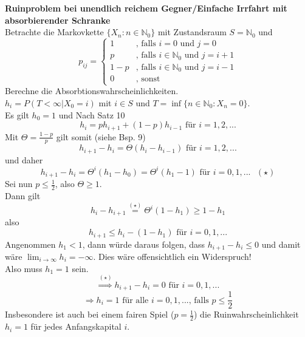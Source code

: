 \documentclass[a4paper,12pt]{article}
\begin{document}
\begin{tcolorbox}[breakable, colframe=blue, colback=white, title=Beispiel 10]
\textbf{Ruinproblem bei unendlich reichem Gegner/Einfache Irrfahrt mit absorbierender Schranke}\\
Betrachte die Markovkette $\{X_n:n \in \mathbb{N}_0\}$ mit Zustandsraum $S = \mathbb{N}_0$ und 
$$
p_{ij} = \begin{cases}
1 & \text{, falls }i = 0 \text{ und } j=0 \\
p & \text{, falls } i \in \mathbb{N}_0 \text{ und } j = i+1\\
1-p & \text{, falls } i \in \mathbb{N}_0 \text{ und } j = i-1 \\
0 & \text{, sonst }
\end{cases}
$$
Berechne die Absorbtionswahrscheinlichkeiten.\\
$h_i = P(T < \infty | X_0 = i)$ mit $i \in S$ und $T = \inf\{n \in \mathbb{N}_0: X_n = 0\}$.\\
Es gilt $h_0 = 1$ und Nach Satz 10
$$
h_i = ph_{i+1} + (1-p)h_{i-1} \text{ für } i=1, 2, ... 
$$
Mit $\Theta = \frac{1-p}{p}$ gilt somit (siehe Bsp. 9)
$$
h_{i+1} - h_i = \Theta(h_i - h_{i-1}) \text{ für }	i=1, 2, ...
$$
und daher
$$
h_{i+1} - h_i = \Theta^{i}(h_1 - h_0) = \Theta^{i}(h_1 - 1) \text{ für } i = 0, 1, ...  \text{ } (\star)
$$
Sei nun $p \leq \frac{1}{2}$, also $\Theta \geq 1$.\\
Dann gilt 
$$
h_i - h_{i+1} \overset{(\star)}{=} \Theta^{i}(1- h_1) \geq 1-h_1
$$
also 
$$
h_{i+1} \leq h_i - (1-h_1) \text{ für } i = 0,1, ...
$$
Angenommen $h_1 < 1$, dann würde daraus folgen, dass $h_{i+1}  - h_i \leq 0$ und damit wäre 
$\lim_{i \to \infty}h_i = - \infty$. Dies wäre offensichtlich ein Widerspruch!\\


Also muss $h_1 = 1$ sein.
$$
\overset{(\star)}{\Rightarrow} h_{i+1} - h_i = 0 \text{ für } i = 0, 1, ... 
$$
$$
\Rightarrow h_i = 1 \text{ für alle } i = 0, 1, ... \text{, falls } p \leq \frac{1}{2}
$$
Insbesondere ist auch bei einem fairen Spiel ($p = \frac{1}{2}$) die Ruinwahrscheinlichkeit $h_i = 1$ für jedes Anfangskapital $i$.\\



\end{tcolorbox}
\end{document}
